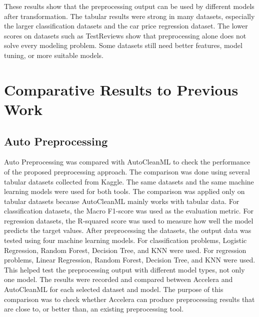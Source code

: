 \documentclass[12pt,a4paper,oneside]{report}
\begin{document}
\noindent These results show that the preprocessing output can be used by different
models after transformation. The tabular results were strong in many datasets,
especially the larger classification datasets and the car price regression
dataset. The lower scores on datasets such as  TestReviews show
that preprocessing alone does not solve every modeling problem. Some datasets
still need better features, model tuning, or more suitable models.

\section{Comparative Results to Previous Work}
\subsection{Auto Preprocessing}
Auto Preprocessing was compared with AutoCleanML to check the performance of the proposed preprocessing approach. The comparison was done using several tabular datasets collected from Kaggle. The same datasets and the same machine learning models were used for both tools.
The comparison was applied only on tabular datasets because AutoCleanML mainly works with tabular data. For classification datasets, the Macro F1-score was used as the evaluation metric. For regression datasets, the R-squared score was used to measure how well the model predicts the target values.
After preprocessing the datasets, the output data was tested using four machine learning models. For classification problems, Logistic Regression, Random Forest, Decision Tree, and KNN were used. For regression problems, Linear Regression, Random Forest, Decision Tree, and KNN were used. This helped test the preprocessing output with different model types, not only one model.
The results were recorded and compared between Accelera and AutoCleanML for each selected dataset and model. The purpose of this comparison was to check whether Accelera can produce preprocessing results that are close to, or better than, an existing preprocessing tool.
\end{document}
